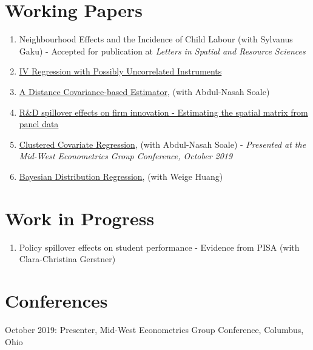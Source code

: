 \documentclass[12pt,letterpaper]{article}
\renewenvironment{itemize}{
  \begin{list}{}{
    \setlength{\leftmargin}{1.5em}
  }
}{
  \end{list}
}
\begin{document}
\section*{Working Papers} %
\begin{enumerate}
	\item Neighbourhood Effects and the Incidence of Child Labour (with Sylvanus Gaku) - Accepted for publication at \textit{Letters in Spatial and Resource Sciences}
	\item \href{https://arxiv.org/pdf/2103.09621.pdf}{IV Regression with Possibly Uncorrelated Instruments}
	\item \href{https://arxiv.org/pdf/2102.07008.pdf}{A Distance Covariance-based Estimator}, (with Abdul-Nasah Soale) 
	\item  \href{https://estsyawo.github.io/Tsyawo_JMP.pdf#}{R\&D spillover effects on firm innovation - Estimating the spatial matrix from panel data}
	\item \href{https://papers.ssrn.com/sol3/papers.cfm?abstract_id=3394012}{Clustered Covariate Regression}, (with Abdul-Nasah Soale) - \textit{Presented at the Mid-West Econometrics Group Conference, October 2019}
	\item \href{https://papers.ssrn.com/sol3/papers.cfm?abstract_id=3048658}{Bayesian Distribution Regression}, (with Weige Huang)
\end{enumerate}

\section*{Work in Progress}
\begin{enumerate}
	\item Policy spillover effects on student performance - Evidence from PISA (with Clara-Christina Gerstner)
\end{enumerate}

\section*{Conferences}
\begin{itemize}
	\item October 2019: Presenter, Mid-West Econometrics Group Conference, Columbus, Ohio
\end{itemize}
\end{document}
